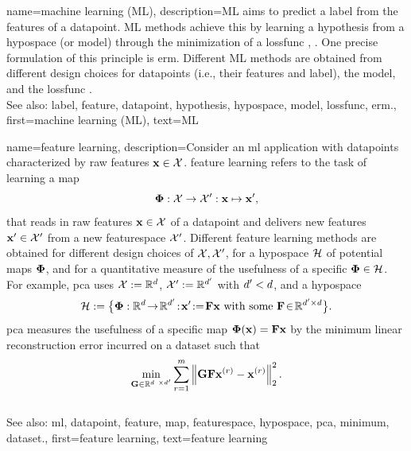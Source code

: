 {name={machine learning (ML)},
	description={ML aims to predict 
	 	a \gls{label} from the \glspl{feature} of a \gls{datapoint}. ML methods achieve 
	 	this by learning a \gls{hypothesis} from a \gls{hypospace} (or \gls{model}) 
	 	through the minimization of a \gls{lossfunc} \cite{MLBasics}, \cite{HastieWainwrightBook}. 
	 	One precise formulation of this principle is \gls{erm}. Different ML methods are 
	 	obtained from different design choices for \glspl{datapoint} (i.e., their \glspl{feature} and \gls{label}), 
	 	the \gls{model}, and the \gls{lossfunc} \cite[Ch. 3]{MLBasics}.
	 			\\ 
		See also: \gls{label}, \gls{feature}, \gls{datapoint}, \gls{hypothesis}, \gls{hypospace}, \gls{model}, \gls{lossfunc}, \gls{erm}.},
	first={machine learning (ML)},
	text={ML}
} 


{name={feature learning},
	description={Consider an \gls{ml} application with \glspl{datapoint} characterized by 
		raw \glspl{feature} ${\bf x} \in \mathcal{X}$. \Gls{feature} learning 
		refers to the task of learning a \gls{map} 
		$${\bf \Phi}: \mathcal{X} \rightarrow \mathcal{X}': {\bf x} \mapsto {\bf x}',$$ 
		that reads in raw \glspl{feature} ${\bf x} \in \mathcal{X}$ of a \gls{datapoint} and delivers new 
		\glspl{feature} ${\bf x}' \in \mathcal{X}'$ from a new \gls{featurespace} $\mathcal{X}'$. 
		Different \gls{feature} learning methods are obtained for different design 
		choices of $\mathcal{X},\mathcal{X}'$, for a \gls{hypospace} $\mathcal{H}$ 
		of potential \glspl{map} ${\bf \Phi}$, and for a quantitative measure of the usefulness of 
		a specific ${\bf \Phi} \in \mathcal{H}$. For example, \gls{pca} 
		uses $\mathcal{X} := \mathbb{R}^{d}$, $\mathcal{X}' := \mathbb{R}^{d'}$ 
		with $d' < d$, and a \gls{hypospace} 
		$$\hypospace\defeq \big\{ \featuremapvec: \mathbb{R}^{\dimlocalmodel}
		\!\rightarrow\! \mathbb{R}^{\dimlocalmodel'}\!:\!\featurevec'\!\defeq\!\mF \featurevec \mbox{ with some } \mF \!\in\! \mathbb{R}^{\dimlocalmodel' \times \dimlocalmodel} \big\}.$$ \Gls{pca} measures the usefulness of a specific \gls{map} ${\bf \Phi}({\bf x})= \mathbf{F} {\bf x}$ 
	by the \gls{minimum} linear reconstruction error incurred on a \gls{dataset} such that 
$$ \min_{\mG \in \mathbb{R}^{\dimlocalmodel \times \dimlocalmodel'}} \sum_{\sampleidx=1}^{\samplesize} \normgeneric{\mG \mF \featurevec^{(\sampleidx)} - \featurevec^{(\sampleidx)}}{2}^{2}.$$ 
			\\ 
		See also: \gls{ml}, \gls{datapoint}, \gls{feature}, \gls{map}, \gls{featurespace}, \gls{hypospace}, \gls{pca}, \gls{minimum}, \gls{dataset}.}, 
	first={feature learning},
	text={feature learning}
} 

